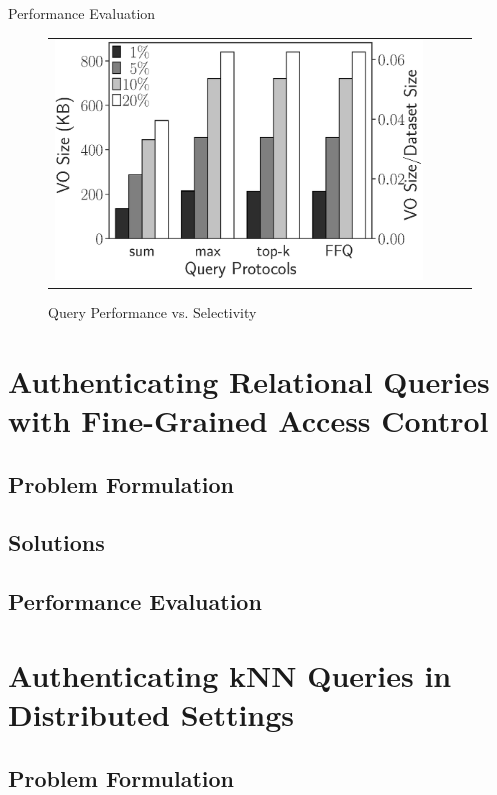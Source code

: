 \documentclass[xcolor={dvipsnames},aspectratio=169,10pt]{beamer}
\begin{document}
\begin{frame}{Performance Evaluation}
\begin{figure}
\begin{tabular}{c@{\quad}lll}
      \includegraphics[valign=m,totalheight=\ht\figbox]{exp-figs/aggregate-queries/tpch_vo.eps}
    \end{tabular}
    \caption{Query Performance vs. Selectivity}
  \end{figure}
\end{frame}

\section{Authenticating Relational Queries with Fine-Grained Access Control}

\subsection{Problem Formulation}

\subsection{Solutions}

\subsection{Performance Evaluation}

\section{Authenticating {kNN} Queries in Distributed Settings}

\subsection{Problem Formulation}
\end{document}
